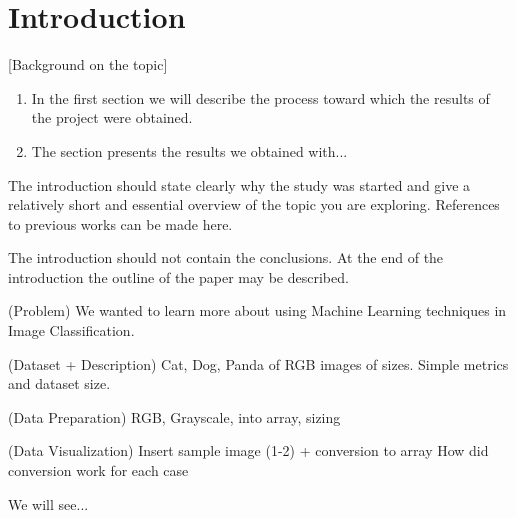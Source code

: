 \section{Introduction}
[Background on the topic]

\begin{enumerate}
\item In the first section we will describe the process toward which the results of the project were obtained.
\item The section presents the results we obtained with...
\end{enumerate}

The introduction should state clearly why the study was started
and give a relatively short and essential overview of the topic
you are exploring. References to previous works can be made here.
 
The introduction should not contain the conclusions. 
At the end of the introduction the outline of the paper may be described.


(Problem)
We wanted to learn more about using Machine Learning techniques in Image Classification.

(Dataset + Description)
Cat, Dog, Panda of RGB images of sizes. Simple metrics and dataset size.

(Data Preparation)
RGB, Grayscale, into array, sizing

(Data Visualization)
Insert sample image (1-2) + conversion to array
How did conversion work for each case

\cite{NAME1} We will see...